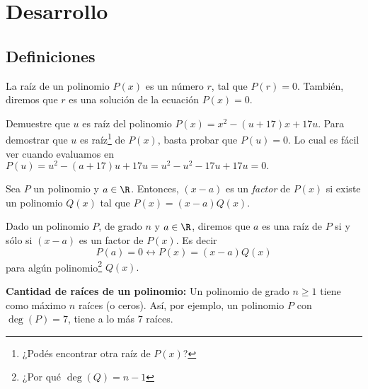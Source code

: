\section{Desarrollo}\label{sec:desarrollo}

\subsection{Definiciones}
{
    \begin{section-definition}
        La raíz de un polinomio $P(x)$ es un número $r$, tal que $P(r) = 0$. También, diremos que $r$ es una solución de la ecuación $P(x) = 0$.
    \end{section-definition}

    \begin{example}
        Demuestre que $u$ es raíz del polinomio $P(x) = x^2 - (u + 17) x + 17u$.
        \exampleProof
        {
            Para demostrar que $u$ es raíz\footnote{¿Podés encontrar otra raíz de $P(x)$?} de $P(x)$, basta probar que $P(u) = 0$. Lo cual es fácil ver cuando evaluamos en $P(u) = u^2 - (a+17)u + 17u = u^2 - u^2 - 17u + 17u = 0.$
        }
    \end{example}


    \begin{section-definition}
        Sea $P$ un polinomio y $a \in \R$. Entonces, $(x - a)$ es un \emph{factor} de $P(x)$ si existe un polinomio $Q(x)$ tal que $P(x) = (x-a)Q(x).$
    \end{section-definition}

    \begin{theorem}
        Dado un polinomio $P$, de grado $n$ y $a \in \R$, diremos que $a$ es una raíz de $P$ si y sólo si $(x-a)$ es un factor de $P(x)$. Es decir \[P(a) = 0 \leftrightarrow P(x) = (x-a)Q(x)\] para algún polinomio\footnote{¿Por qué $\deg{(Q)} = n-1$} $Q(x).$
    \end{theorem}

    \textbf{Cantidad de raíces de un polinomio:} Un polinomio de grado $n\geq 1$ tiene como máximo $n$ raíces (o ceros). Así, por ejemplo, un polinomio $P$ con $\deg{(P)} = 7$, tiene a lo más 7 raíces.
}
\label{subsec:definiciones}


